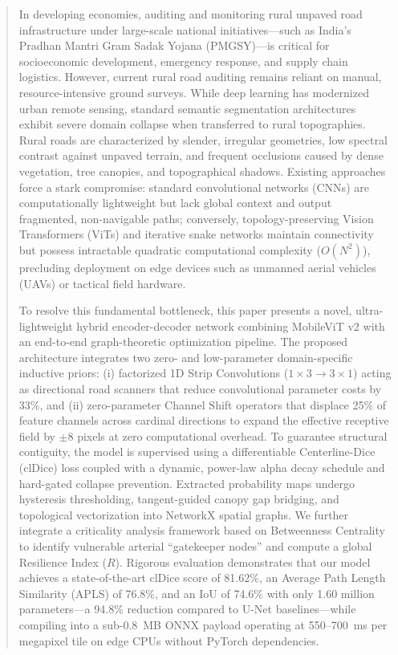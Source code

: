 \documentclass[conference]{IEEEtran}
\begin{document}
\begin{abstract}
In developing economies, auditing and monitoring rural unpaved road infrastructure under large-scale national initiatives—such as India's Pradhan Mantri Gram Sadak Yojana (PMGSY)—is critical for socioeconomic development, emergency response, and supply chain logistics. However, current rural road auditing remains reliant on manual, resource-intensive ground surveys. While deep learning has modernized urban remote sensing, standard semantic segmentation architectures exhibit severe domain collapse when transferred to rural topographies. Rural roads are characterized by slender, irregular geometries, low spectral contrast against unpaved terrain, and frequent occlusions caused by dense vegetation, tree canopies, and topographical shadows. Existing approaches force a stark compromise: standard convolutional networks (CNNs) are computationally lightweight but lack global context and output fragmented, non-navigable paths; conversely, topology-preserving Vision Transformers (ViTs) and iterative snake networks maintain connectivity but possess intractable quadratic computational complexity ($O(N^2)$), precluding deployment on edge devices such as unmanned aerial vehicles (UAVs) or tactical field hardware.

To resolve this fundamental bottleneck, this paper presents a novel, ultra-lightweight hybrid encoder-decoder network combining MobileViT v2 with an end-to-end graph-theoretic optimization pipeline. The proposed architecture integrates two zero- and low-parameter domain-specific inductive priors: (i) factorized 1D Strip Convolutions ($1\times3 \to 3\times1$) acting as directional road scanners that reduce convolutional parameter costs by 33\%, and (ii) zero-parameter Channel Shift operators that displace 25\% of feature channels across cardinal directions to expand the effective receptive field by $\pm8$ pixels at zero computational overhead. To guarantee structural contiguity, the model is supervised using a differentiable Centerline-Dice (clDice) loss coupled with a dynamic, power-law alpha decay schedule and hard-gated collapse prevention. Extracted probability maps undergo hysteresis thresholding, tangent-guided canopy gap bridging, and topological vectorization into NetworkX spatial graphs. We further integrate a criticality analysis framework based on Betweenness Centrality to identify vulnerable arterial ``gatekeeper nodes'' and compute a global Resilience Index ($R$). Rigorous evaluation demonstrates that our model achieves a state-of-the-art clDice score of 81.62\%, an Average Path Length Similarity (APLS) of 76.8\%, and an IoU of 74.6\% with only 1.60 million parameters—a 94.8\% reduction compared to U-Net baselines—while compiling into a sub-0.8~MB ONNX payload operating at 550--700~ms per megapixel tile on edge CPUs without PyTorch dependencies.
\end{abstract}
\end{document}
